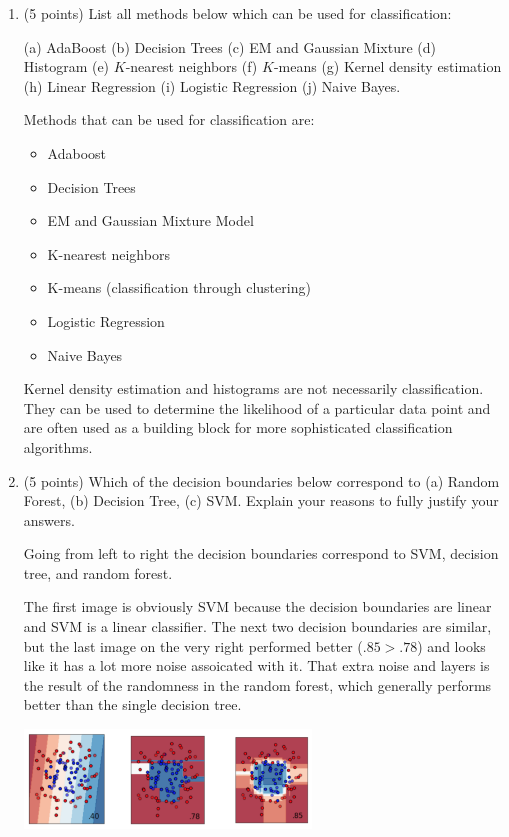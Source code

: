 \documentclass[a4paper,12pt,fleqn]{article}
\begin{document}
\begin{enumerate}
\item (5 points) List all methods below which can be used for classification:

(a) AdaBoost (b) Decision Trees (c) EM and Gaussian Mixture (d) Histogram (e) $K$-nearest neighbors (f) $K$-means (g) Kernel density estimation 
(h) Linear Regression (i) Logistic Regression (j) Naive Bayes. 



\vspace{.15in}
Methods that can be used for classification are:
\begin{itemize}
\item Adaboost
\item Decision Trees
\item EM and Gaussian Mixture Model
\item K-nearest neighbors
\item K-means (classification through clustering)
\item Logistic Regression
\item Naive Bayes

\end{itemize}
Kernel density estimation and histograms are not necessarily classification.  They can be used to determine the likelihood of a particular data point and are often used as a building block for more sophisticated classification algorithms.
\vspace{.15in}



\item (5 points) Which of the decision boundaries below correspond to (a) Random Forest, (b) Decision Tree, (c) SVM. Explain your reasons  to fully justify your answers. 

\vspace{.15in}

Going from left to right the decision boundaries correspond to SVM, decision tree, and random forest.

The first image is obviously SVM because the decision boundaries are linear and SVM is a linear classifier.  The next two decision boundaries are similar, but the last image on the very right performed better ($.85 > .78$) and looks like it has a lot more noise assoicated with it.  That extra noise and layers is the result of the randomness in the random forest, which generally performs better than the single decision tree.

%
\begin{center}
\includegraphics[width = 0.6\textwidth]{decision}
\end{center}


\end{enumerate}
\end{document}
